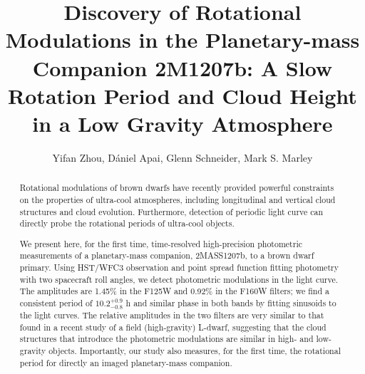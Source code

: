 \documentclass[apj]{emulateapj}
\begin{document}
\title{Discovery of Rotational Modulations in the Planetary-mass
  Companion 2M1207b: A Slow Rotation Period and Cloud Height in a Low
  Gravity Atmosphere}
\author{Yifan Zhou, D\'aniel Apai,
  Glenn Schneider,  Mark S. Marley}


\begin{abstract}
  Rotational modulations of brown dwarfs have recently provided
  powerful constraints on the properties of ultra-cool atmospheres,
  including longitudinal and vertical cloud structures and cloud
  evolution. Furthermore, detection of periodic light curve  can directly probe the rotational periods of ultra-cool objects.

  We present here, for the first time, time-resolved high-precision
  photometric measurements of a planetary-mass companion, 2MASS1207b,
  to a brown dwarf primary. Using HST/WFC3 observation and point
  spread function fitting photometry with two spacecraft roll angles,
  we detect photometric modulations in the light curve. The amplitudes
  are 1.45\% in the F125W and 0.92\% in the F160W filters; we find a
  consistent period of $10.2^{+0.9}_{-0.8}$
  h and similar phase in both bands by fitting sinusoids to the light curves. {\color{red}The relative amplitudes in the two filters are very similar to
  that found in a recent study of a field (high-gravity) L-dwarf,
  suggesting that the cloud structures that introduce the photometric
  modulations are similar in high- and low-gravity
  objects.} Importantly, our study also measures, for the first time,
  the rotational period for directly an imaged planetary-mass companion.
\end{abstract}

\maketitle
%
\end{document}

